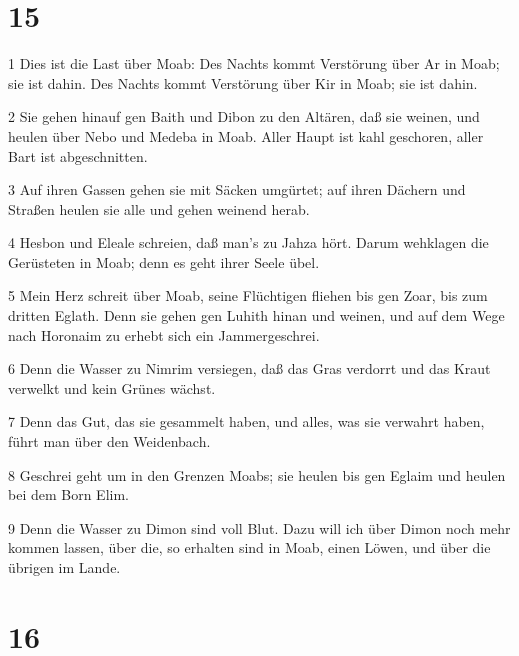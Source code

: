 \chapter{15}

\par 1 Dies ist die Last über Moab: Des Nachts kommt Verstörung über Ar in Moab; sie ist dahin. Des Nachts kommt Verstörung über Kir in Moab; sie ist dahin.
\par 2 Sie gehen hinauf gen Baith und Dibon zu den Altären, daß sie weinen, und heulen über Nebo und Medeba in Moab. Aller Haupt ist kahl geschoren, aller Bart ist abgeschnitten.
\par 3 Auf ihren Gassen gehen sie mit Säcken umgürtet; auf ihren Dächern und Straßen heulen sie alle und gehen weinend herab.
\par 4 Hesbon und Eleale schreien, daß man's zu Jahza hört. Darum wehklagen die Gerüsteten in Moab; denn es geht ihrer Seele übel.
\par 5 Mein Herz schreit über Moab, seine Flüchtigen fliehen bis gen Zoar, bis zum dritten Eglath. Denn sie gehen gen Luhith hinan und weinen, und auf dem Wege nach Horonaim zu erhebt sich ein Jammergeschrei.
\par 6 Denn die Wasser zu Nimrim versiegen, daß das Gras verdorrt und das Kraut verwelkt und kein Grünes wächst.
\par 7 Denn das Gut, das sie gesammelt haben, und alles, was sie verwahrt haben, führt man über den Weidenbach.
\par 8 Geschrei geht um in den Grenzen Moabs; sie heulen bis gen Eglaim und heulen bei dem Born Elim.
\par 9 Denn die Wasser zu Dimon sind voll Blut. Dazu will ich über Dimon noch mehr kommen lassen, über die, so erhalten sind in Moab, einen Löwen, und über die übrigen im Lande.

\chapter{16}

